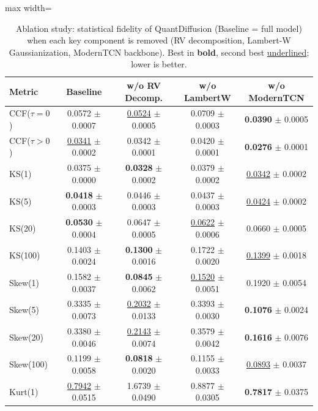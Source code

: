 \documentclass[sigconf,natbib=false]{acmart}
\begin{document}
\begin{table}[htbp]
\centering
\caption{Ablation study: statistical fidelity of QuantDiffusion (Baseline = full model) when each key component is removed (RV decomposition, Lambert-W Gaussianization, ModernTCN backbone). Best in \textbf{bold}, second best \underline{underlined}; lower is better.}
\label{table:ablation_fidelity}

\scriptsize
\setlength{\tabcolsep}{3pt}
\renewcommand{\arraystretch}{0.9}

\begin{adjustbox}{max width=\textwidth}
\begin{tabular}{l|cccc}
\toprule
\textbf{Metric} & \textbf{Baseline} & \textbf{w/o RV Decomp.} & \textbf{w/o LambertW} & \textbf{w/o ModernTCN} \\
\midrule
CCF($\tau = 0$)
& 0.0572 $\pm$ 0.0007
& \underline{0.0524} $\pm$ 0.0005
& 0.0709 $\pm$ 0.0003
& \textbf{0.0390} $\pm$ 0.0005 \\
CCF($\tau > 0$)
& \underline{0.0341} $\pm$ 0.0002
& 0.0342 $\pm$ 0.0001
& 0.0420 $\pm$ 0.0001
& \textbf{0.0276} $\pm$ 0.0001 \\
\midrule
KS(1)
& 0.0375 $\pm$ 0.0000
& \textbf{0.0328} $\pm$ 0.0002
& 0.0379 $\pm$ 0.0002
& \underline{0.0342} $\pm$ 0.0002 \\
KS(5)
& \textbf{0.0418} $\pm$ 0.0003
& 0.0446 $\pm$ 0.0003
& 0.0437 $\pm$ 0.0003
& \underline{0.0424} $\pm$ 0.0002 \\
KS(20)
& \textbf{0.0530} $\pm$ 0.0004
& 0.0647 $\pm$ 0.0005
& \underline{0.0622} $\pm$ 0.0006
& 0.0660 $\pm$ 0.0005 \\
KS(100)
& 0.1403 $\pm$ 0.0024
& \textbf{0.1300} $\pm$ 0.0016
& 0.1722 $\pm$ 0.0020
& \underline{0.1399} $\pm$ 0.0018 \\
\midrule
Skew(1)
& 0.1582 $\pm$ 0.0037
& \textbf{0.0845} $\pm$ 0.0062
& \underline{0.1520} $\pm$ 0.0051
& 0.1920 $\pm$ 0.0054 \\
Skew(5)
& 0.3335 $\pm$ 0.0073
& \underline{0.2032} $\pm$ 0.0133
& 0.3393 $\pm$ 0.0030
& \textbf{0.1076} $\pm$ 0.0024 \\
Skew(20)
& 0.3380 $\pm$ 0.0046
& \underline{0.2143} $\pm$ 0.0074
& 0.3579 $\pm$ 0.0042
& \textbf{0.1616} $\pm$ 0.0076 \\
Skew(100)
& 0.1199 $\pm$ 0.0058
& \textbf{0.0818} $\pm$ 0.0020
& 0.1155 $\pm$ 0.0033
& \underline{0.0893} $\pm$ 0.0037 \\
\midrule
Kurt(1)
& \underline{0.7942} $\pm$ 0.0515
& 1.6739 $\pm$ 0.0490
& 0.8877 $\pm$ 0.0305
& \textbf{0.7817} $\pm$ 0.0375 \\

\end{tabular}
\end{adjustbox}
\end{table}
\end{document}
